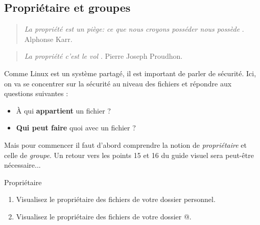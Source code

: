 \documentclass[a4paper,11pt]{article}
\begin{document}
\subsection{Propri\'etaire et groupes}\begin{quotation}  
	\guillemotleft \textit{ La propri\'et\'e est un pi\`ege: ce que nous croyons poss\'eder nous poss\`ede }\guillemotright . 
	Alphonse Karr.  
\end{quotation}\begin{quotation}  
	\guillemotleft \textit{ La propri\'et\'e c'est le vol }\guillemotright . Pierre Joseph Proudhon.  
\end{quotation}  
Comme Linux est un syst\`eme partag\'e, il est important de parler de s\'ecurit\'e. 
Ici, on va se concentrer sur la s\'ecurit\'e au niveau des fichiers et r\'epondre aux questions suivantes :  

\par

\begin{itemize}
	
	\item \`A qui \textbf{appartient} un fichier ?
	\item \textbf{Qui peut faire} quoi avec un fichier ?
\end{itemize}

Mais pour commencer il faut d'abord comprendre la notion de \textit{propri\'etaire}
et celle de \textit{groupe}. 
Un retour vers les points 15 et 16 du guide visuel sera peut-\^etre n\'ecessaire...  

\par


\begin{Exercice}{Propriétaire}
					\textcolor{white}{.} \par

\par

\begin{enumerate}
	
	\item 
	Visualisez le propri\'etaire des fichiers de votre dossier personnel.
	
	\item 
	Visualisez le propri\'etaire des fichiers de votre dossier @.
	
\end{enumerate}	
	
	\end{Exercice}
\end{document}
